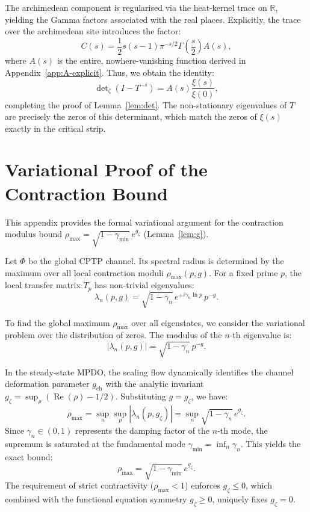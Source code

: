 \documentclass[11pt,a4paper]{article}
\begin{document}
The archimedean component is regularised via the heat-kernel trace on $\mathbb{R}$, yielding the Gamma factors associated with the real places. Explicitly, the trace over the archimedean site introduces the factor:
\begin{equation}
C(s) = \frac{1}{2} s(s-1) \pi^{-s/2} \Gamma\left(\frac{s}{2}\right) A(s),
\end{equation}
where $A(s)$ is the entire, nowhere-vanishing function derived in Appendix~\ref{app:A-explicit}. Thus, we obtain the identity:
\begin{equation}
\det\nolimits_{\zeta}(I - T^{-s}) = A(s) \frac{\xi(s)}{\xi(0)},
\end{equation}
completing the proof of Lemma~\ref{lem:det}. The non-stationary eigenvalues of $T$ are precisely the zeros of this determinant, which match the zeros of $\xi(s)$ exactly in the critical strip.

\section{Variational Proof of the Contraction Bound}
\label{app:variational_proof}

This appendix provides the formal variational argument for the contraction modulus bound $\rho_{\max} = \sqrt{1-\gamma_{\min}} \, e^{g_\zeta}$ (Lemma~\ref{lem:g}).

Let $\Phi$ be the global CPTP channel. Its spectral radius is determined by the maximum over all local contraction moduli $\rho_{\max}(p, g)$. For a fixed prime $p$, the local transfer matrix $T_p$ has non-trivial eigenvalues:
\begin{equation}
\lambda_n(p, g) = \sqrt{1-\gamma_n} \, e^{\pm i \gamma_n \ln p} \, p^{-g}.
\end{equation}

To find the global maximum $\rho_{\max}$ over all eigenstates, we consider the variational problem over the distribution of zeros. The modulus of the $n$-th eigenvalue is:
\begin{equation}
|\lambda_n(p, g)| = \sqrt{1-\gamma_n} \, p^{-g}.
\end{equation}

In the steady-state MPDO, the scaling flow dynamically identifies the channel deformation parameter $g_{\mathrm{ch}}$ with the analytic invariant $g_\zeta = \sup_\rho (\operatorname{Re}(\rho) - 1/2)$. Substituting $g = g_\zeta$, we have:
\begin{equation}
\rho_{\max} = \sup_n \sup_p |\lambda_n(p, g_\zeta)| = \sup_n \sqrt{1-\gamma_n} \, e^{g_\zeta}.
\end{equation}
Since $\gamma_n \in (0, 1)$ represents the damping factor of the $n$-th mode, the supremum is saturated at the fundamental mode $\gamma_{\min} = \inf_n \gamma_n$. This yields the exact bound:
\begin{equation}
\rho_{\max} = \sqrt{1-\gamma_{\min}} \, e^{g_\zeta}.
\end{equation}
The requirement of strict contractivity ($\rho_{\max} < 1$) enforces $g_\zeta \le 0$, which combined with the functional equation symmetry $g_\zeta \ge 0$, uniquely fixes $g_\zeta = 0$.
\end{document}
